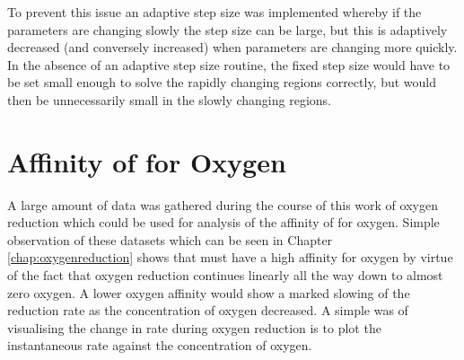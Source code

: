 To prevent this issue an adaptive step size was implemented whereby if the parameters are changing slowly the step size can be large, but this is adaptively decreased (and conversely increased) when parameters are changing more quickly. In the absence of an adaptive step size routine, the fixed step size would have to be set small enough to solve the rapidly changing regions correctly, but would then be unnecessarily small in the slowly changing regions.

\section{\texorpdfstring{Affinity of \cbbthree{} for Oxygen}{Affinity of cbb3 for Oxygen}}
A large amount of data was gathered during the course of this work of oxygen reduction which could be used for analysis of the affinity of \cbbthree{} for oxygen. Simple observation of these datasets which can be seen in Chapter \ref{chap:oxygenreduction} shows that \cbbthree{} must have a high affinity for oxygen by virtue of the fact that oxygen reduction continues linearly all the way down to almost zero oxygen. A lower oxygen affinity would show a marked slowing of the reduction rate as the concentration of oxygen decreased. A simple was of visualising the change in rate during oxygen reduction is to plot the instantaneous rate against the concentration of oxygen.

